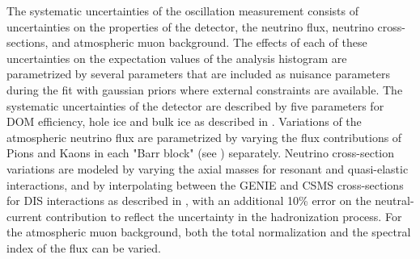 The systematic uncertainties of the oscillation measurement consists of uncertainties on the properties of the detector, the neutrino flux, neutrino cross-sections, and atmospheric muon background. The effects of each of these uncertainties on the expectation values of the analysis histogram are parametrized by several parameters that are included as nuisance parameters during the fit with gaussian priors where external constraints are available. The systematic uncertainties of the detector are described by five parameters for DOM efficiency, hole ice and bulk ice as described in . Variations of the atmospheric neutrino flux are parametrized by varying the flux contributions of Pions and Kaons in each "Barr block" (see ) separately. Neutrino cross-section variations are modeled by varying the axial masses for resonant and quasi-elastic interactions, and by interpolating between the \textsc{GENIE} and \textsc{CSMS} cross-sections for DIS interactions as described in , with an additional 10\% error on the neutral-current contribution to reflect the uncertainty in the hadronization process. For the atmospheric muon background, both the total normalization and the spectral index of the flux can be varied.

